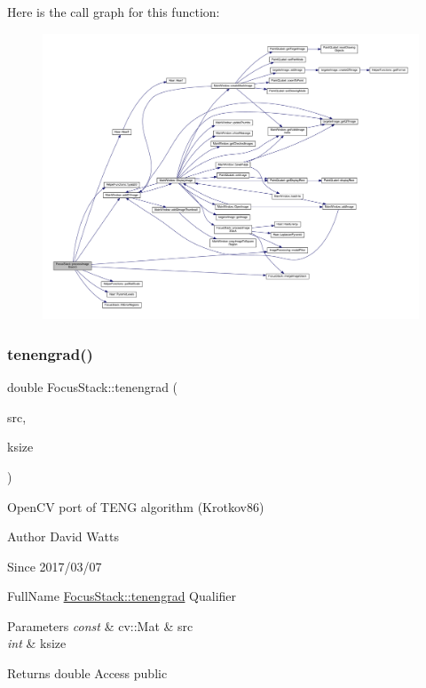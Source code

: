 Here is the call graph for this function\+:
\nopagebreak
\begin{figure}[H]
\begin{center}
\leavevmode
\includegraphics[width=350pt]{class_focus_stack_a141b4869671825fed21068a9c9f2c150_cgraph}
\end{center}
\end{figure}
\mbox{\label{class_focus_stack_a6b65715e671ef5a016d9e216705d687d}} 
\subsubsection{\texorpdfstring{tenengrad()}{tenengrad()}}
{\footnotesize\ttfamily double Focus\+Stack\+::tenengrad (\begin{DoxyParamCaption}\item[{const cv\+::\+Mat \&}]{src,  }\item[{int}]{ksize }\end{DoxyParamCaption})\hspace{0.3cm}{\ttfamily [static]}}

Open\+CV port of \textquotesingle{}T\+E\+NG\textquotesingle{} algorithm (Krotkov86)

\begin{DoxyAuthor}{Author}
David Watts 
\end{DoxyAuthor}
\begin{DoxySince}{Since}
2017/03/07
\end{DoxySince}
Full\+Name \hyperlink{class_focus_stack_a6b65715e671ef5a016d9e216705d687d}{Focus\+Stack\+::tenengrad} Qualifier 
\begin{DoxyParams}{Parameters}
{\em const} & cv\+::\+Mat \& src \\
\hline
{\em int} & ksize \\
\hline
\end{DoxyParams}
\begin{DoxyReturn}{Returns}
double Access public 
\end{DoxyReturn}


